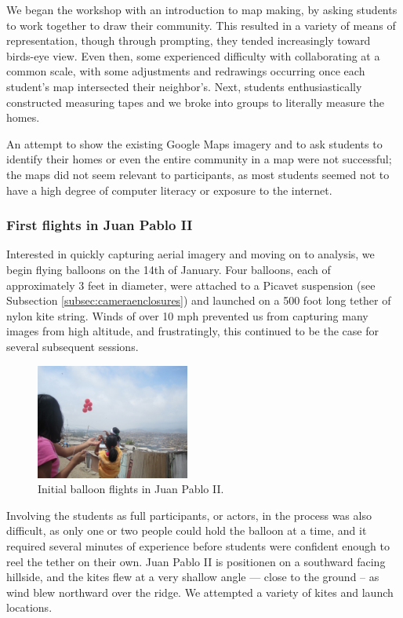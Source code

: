 \documentclass[11pt]{report}
\begin{document}
We began the workshop with an introduction to map making, by asking students to work together to draw their community. This resulted in a variety of means of representation, though through prompting, they tended increasingly toward birds-eye view. Even then, some experienced difficulty with collaborating at a common scale, with some adjustments and redrawings occurring once each student's map intersected their neighbor's. Next, students enthusiastically constructed measuring tapes and we broke into groups to literally measure the homes. 

An attempt to show the existing Google Maps imagery and to ask students to identify their homes or even the entire community in a map were not successful; the maps did not seem relevant to participants, as most students seemed not to have a high degree of computer literacy or exposure to the internet. 

\subsubsection{First flights in Juan Pablo II}

Interested in quickly capturing aerial imagery and moving on to analysis, we begin flying balloons on the 14th of January. Four balloons, each of approximately 3 feet in diameter, were attached to a Picavet suspension (see Subsection \ref{subsec:cameraenclosures}) and launched on a 500 foot long tether of nylon kite string. Winds of over 10 mph prevented us from capturing many images from high altitude, and frustratingly, this continued to be the case for several subsequent sessions. 

\begin{figure}
	\begin{flushright}
		\includegraphics[width=0.45\textwidth]{images/juan-pablo-first-flight.jpg}
		\caption{Initial balloon flights in Juan Pablo II.}
	\end{flushright}
\end{figure}

Involving the students as full participants, or actors, in the process was also difficult, as only one or two people could hold the balloon at a time, and it required several minutes of experience before students were confident enough to reel the tether on their own. Juan Pablo II is positionen on a southward facing hillside, and the kites flew at a very shallow angle --- close to the ground -- as wind blew northward over the ridge. We attempted a variety of kites and launch locations. 
\end{document}
